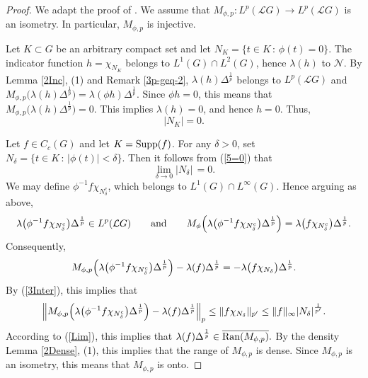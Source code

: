 \documentclass[12pt]{amsart}
\newcommand{\N}{\mbox{${\mathcal N}$}}
\newcommand{\norm}[1]{\Vert#1\Vert}
\newcommand{\Bignorm}[1]{\Bigl\Vert#1\Bigr\Vert}
\theoremstyle{remark}
\theoremstyle{definition}
\numberwithin{equation}{section}
\begin{document}
\begin{proof}
We adapt the proof of \cite[Lemma 3.9]{AKLZ}. We assume that
$M_{\phi,p}\colon L^p({\mathcal L}G)\to L^p({\mathcal L}G)$ is an isometry.
In particular, $M_{\phi,p}$ is injective.





Let $K\subset G$ be an arbitrary  compact 
set and let $N_K=\{t\in K\, :\, \phi(t)=0\}$.
The indicator function
$h=\chi_{N_K}$ belongs to  $L^1(G)\cap L^2(G)$, hence $\lambda(h)$ to $\N$.
By Lemma \ref{2Inc}, (1) and Remark \ref{3p-geq-2}, $\lambda(h)
\Delta^{\frac{1}{p}}$ belongs to $L^p({\mathcal L}G)$
and $M_{\phi,p}\bigl(\lambda(h)\Delta^{\frac{1}{p}}\bigr) = \lambda(\phi h)\Delta^{\frac{1}{p}}$.
Since $\phi h=0$, this means that $M_{\phi,p}\bigl(\lambda(h)\Delta^{\frac{1}{p}}\bigr)=0$.
This implies  $\lambda(h)=0$, and hence $h=0$. Thus,
\begin{equation}\label{5=0}
\vert N_K\vert =0.
\end{equation}






Let $f\in C_c(G)$ and let
$K={\rm Supp}(f)$. 
For any $\delta>0$, set
$N_\delta =\{t\in K\, :\, \vert\phi(t)\vert <\delta\}$. 
Then it follows from (\ref{5=0}) that 
\begin{equation}\label{Lim}
\lim_{\delta\to 0}\vert N_\delta\vert \,=0.
\end{equation}
We may define 
$\phi^{-1} f\chi_{N_\delta^c}$, which belongs to $L^1(G)\cap L^\infty(G)$. Hence arguing as above, 
$$
\lambda\bigl(\phi^{-1} f\chi_{N_\delta^c}\bigr)\Delta^{\frac{1}{p}}\in L^p({\mathcal L}G)
\qquad\hbox{and}\qquad
M_\phi\Bigl(\lambda\bigl(\phi^{-1} f\chi_{N_\delta^c}\bigr)\Delta^{\frac{1}{p}} \Bigr)
= \lambda\bigl(f\chi_{N_\delta^c}\bigr) 
\Delta^{\frac{1}{p}}.
$$
Consequently,
$$
M_{\phi,p}\Bigl(\lambda\bigl(\phi^{-1} f\chi_{N_\delta^c}\bigr)
\Delta^{\frac{1}{p}} \Bigr)
- \lambda(f) \Delta^{\frac{1}{p}}  = 
-\lambda\bigl(f\chi_{N_\delta}\bigr) \Delta^{\frac{1}{p}}.
$$
By (\ref{3Inter}), this implies that 
$$
\Bignorm{M_{\phi,p}\Bigl(\lambda\bigl(\phi^{-1} f\chi_{N_\delta^c}\bigr)\Delta^{\frac{1}{p}}\Bigr)
- \lambda(f) \Delta^{\frac{1}{p}}}_p \leq \norm{f\chi_{N_\delta}}_{p'}
\leq \norm{f}_\infty \vert N_\delta\vert^{\frac{1}{p'}}.
$$
According to (\ref{Lim}), this implies that 
$\lambda(f) \Delta^{\frac{1}{p}} \in \overline{{\rm Ran}(M_{\phi,p})}.$ By the density Lemma \ref{2Dense}, (1), this implies that the range of $M_{\phi,p}$ is dense.
Since $M_{\phi,p}$ is an isometry, this means that $M_{\phi,p}$ is onto.
\end{proof}
\end{document}
